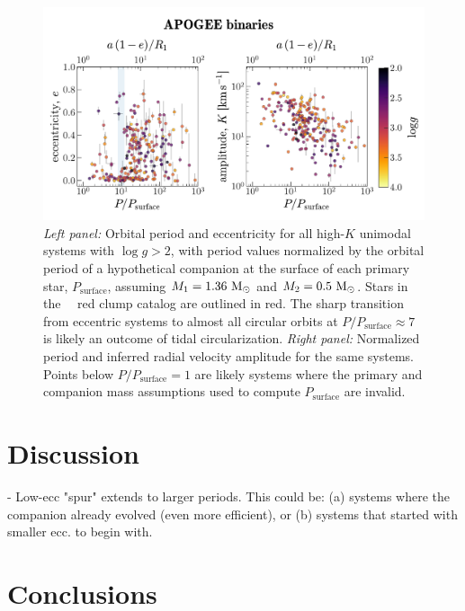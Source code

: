 \documentclass[modern, letterpaper]{aastex62}
\newcommand{\apogee}{\project{\acronym{APOGEE}}}
\newcommand{\DR}{\acronym{DR14}}
\begin{document}
\begin{figure}[h]
\begin{center}
\includegraphics[width=\textwidth]{P-e-K}
\end{center}
\caption{%
\textit{Left panel:} Orbital period and eccentricity for all high-$K$ unimodal
systems with $\log g > 2$, with period values normalized by the orbital period
of a hypothetical companion at the surface of each primary star,
$P_{\textrm{surface}}$, assuming $M_1 = 1.36~\mathrm{M}_\odot$ and $M_2 =0.5~\mathrm{M}_\odot$.
Stars in the \apogee\ \DR\ red clump catalog are outlined in red.
The sharp transition from eccentric systems to almost all circular orbits at
$P/P_\textrm{surface} \approx 7$ is likely an outcome of tidal circularization.
\textit{Right panel:} Normalized period and inferred radial velocity amplitude
for the same systems.
Points below $P/P_\textrm{surface} = 1$ are likely systems where the primary and
companion mass assumptions used to compute $P_\textrm{surface}$ are invalid.
\label{fig:PeK}
}
\end{figure}


\section{Discussion} \label{sec:discussion}

- Low-ecc "spur" extends to larger periods. This could be: (a) systems where the companion already evolved (even more efficient), or (b) systems that started with smaller ecc. to begin with.


\section{Conclusions}



\acknowledgements
\end{document}
